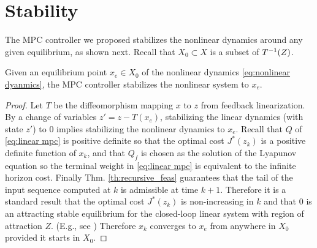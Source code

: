 \section{Stability}
\label{[sec:stability]}
The MPC controller we proposed stabilizes the nonlinear dynamics around any given equilibrium, as shown next. 
Recall that $X_0 \subset X$ is a subset of $T^{-1}(Z)$.
\begin{theorem}[Stability]
Given an equilibrium point $x_e \in X_0$ of the nonlinear dynamics \eqref{eq:nonlinear dyanmics}, the MPC controller stabilizes the nonlinear system to $x_e$.
\end{theorem}

\begin{proof}
Let $T$ be the diffeomorphism mapping $x$ to $z$ from feedback linearization.
By a change of variables $z' = z - T(x_e)$, stabilizing the linear dynamics (with state $z'$) to 0 implies stabilizing the nonlinear dynamics to $x_e$.
Recall that $Q$ of \eqref{eq:linear mpc} is positive definite so that the optimal cost $J^*(z_k)$ is a positive definite function of $x_k$, and that $Q_f$ is chosen as the solution of the Lyapunov equation so the terminal weight in \eqref{eq:linear mpc} is equivalent to the infinite horizon cost. 
Finally Thm.  \ref{th:recursive_feas} guarantees that the tail of the input sequence computed at $k$ is admissible at time $k+1$. 
Therefore it is a standard result that the optimal cost $J^{*}(z_k)$ is non-increasing in $k$ and that $0$ is an attracting stable equilibrium for the closed-loop linear system with region of attraction $Z$. (E.g., see \cite{CannonK15MPC} )
Therefore $x_k$ converges to $x_e$ from anywhere in $X_0$ provided it starts in $X_0$.
\end{proof}